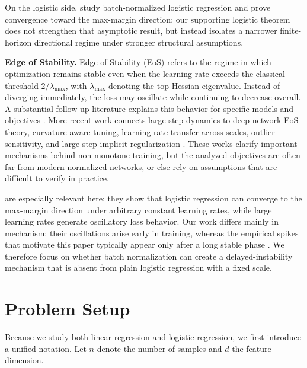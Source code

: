 \documentclass[pdflatex,sn-basic]{sn-jnl}%
\theoremstyle{thmstyleone}%
\begin{document}
On the logistic side, \citet{implicit_bias_BN} study batch-normalized logistic regression and prove convergence toward the max-margin direction; our supporting logistic theorem does not strengthen that asymptotic result, but instead isolates a narrower finite-horizon directional regime under stronger structural assumptions.

\noindent
\textbf{Edge of Stability.} 
Edge of Stability (EoS) \citep{First_EOS} refers to the regime in which optimization remains stable even when the learning rate exceeds the classical threshold $2/\lambda_{\max}$, with $\lambda_{\max}$ denoting the top Hessian eigenvalue. Instead of diverging immediately, the loss may oscillate while continuing to decrease overall. A substantial follow-up literature explains this behavior for specific models and objectives \citep{eos_minimalist, chen2022gradient, ahn2023learning, even2023s, ma2022beyond, ahn2022understanding, eos_Self_stabilization, wang2022analyzing}. More recent work connects large-step dynamics to deep-network EoS theory, curvature-aware tuning, learning-rate transfer across scales, outlier sensitivity, and large-step implicit regularization \citep{arora2022understanding_eos,roulet2024stepping_edge,noci2024super_consistency,rosenfeld2024outliers_opposing_signals,qiao2024stable_minima}. These works clarify important mechanisms behind non-monotone training, but the analyzed objectives are often far from modern normalized networks, or else rely on assumptions that are difficult to verify in practice.

\citet{eos_logistic_regression} are especially relevant here: they show that logistic regression can converge to the max-margin direction under arbitrary constant learning rates, while large learning rates generate oscillatory loss behavior. Our work differs mainly in mechanism: their oscillations arise early in training, whereas the empirical spikes that motivate this paper typically appear only after a long stable phase \citep{Spike_Spike_No_More, Spike_A_theory_on}. We therefore focus on whether batch normalization can create a delayed-instability mechanism that is absent from plain logistic regression with a fixed scale.


\section{Problem Setup}\label{ProblemSetup}
Because we study both linear regression and logistic regression, we first introduce a unified notation. 
Let $n$ denote the number of samples and $d$ the feature dimension. 
\end{document}
